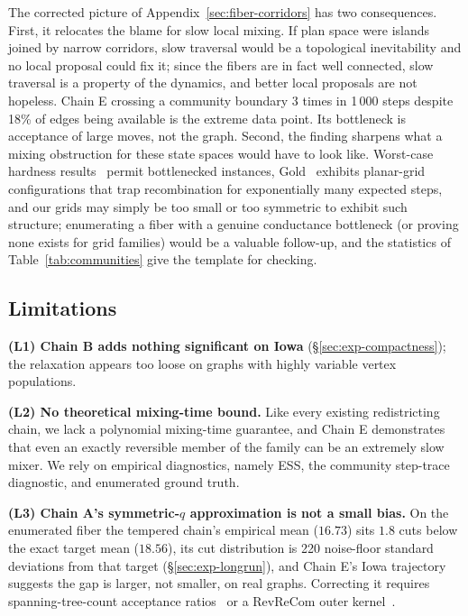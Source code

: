 \documentclass[11pt]{article}
\begin{document}
The corrected picture of Appendix~\ref{sec:fiber-corridors} has two
consequences. First, it relocates the blame for
slow local mixing. If plan space were islands joined by narrow
corridors, slow traversal would be a topological inevitability and no
local proposal could fix it; since the fibers are in fact well
connected, slow traversal is
a property of the dynamics, and better local proposals are not
hopeless. Chain E crossing a community boundary 3 times in 1\,000
steps despite 18\% of edges being available is the extreme data point. Its
bottleneck is acceptance of large moves, not the graph. Second, the
finding sharpens what a mixing obstruction for these state spaces
would have to look like. Worst-case hardness
results~\cite{akitaya2022reconfiguration,charikar2023complexity}
permit bottlenecked instances, Gold~\cite{gold2026adversarial}
exhibits planar-grid configurations that trap recombination for
exponentially many expected steps, and our grids may simply be too
small or too symmetric to exhibit such structure; enumerating a fiber with a genuine
conductance bottleneck (or proving none exists for grid families)
would be a valuable follow-up, and the statistics of
Table~\ref{tab:communities} give the template for checking.

\subsection{Limitations}\label{sec:disc-limits}

\textbf{(L1) Chain B adds nothing significant on Iowa}
(\S\ref{sec:exp-compactness}); the relaxation appears too loose on
graphs with highly variable vertex populations.

\textbf{(L2) No theoretical mixing-time bound.} Like every existing
redistricting chain, we lack a polynomial mixing-time guarantee, and
Chain E demonstrates that even an exactly reversible member of the
family can be an extremely slow mixer. We rely on empirical
diagnostics, namely ESS, the community step-trace diagnostic, and enumerated
ground truth.

\textbf{(L3) Chain A's symmetric-$q$ approximation is not a small
bias.} On the enumerated fiber the tempered chain's empirical mean
($16.73$) sits $1.8$ cuts below the exact target mean ($18.56$), its
cut distribution is 220 noise-floor standard deviations from that
target (\S\ref{sec:exp-longrun}), and
Chain E's Iowa trajectory suggests the gap is larger, not smaller, on
real graphs. Correcting it requires spanning-tree-count acceptance
ratios~\cite{autry2023metropolized} or a RevReCom outer
kernel~\cite{cannon2022spanning}.
\end{document}
